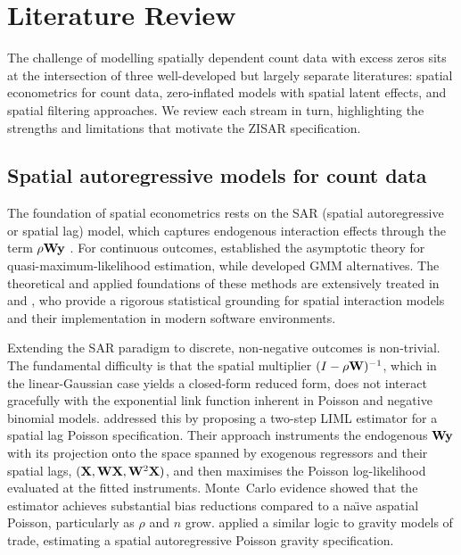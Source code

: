 \section{Literature Review}\label{sec:literature}

The challenge of modelling spatially dependent count data with excess zeros sits at the intersection of three well-developed but largely separate literatures: spatial econometrics for count data, zero-inflated models with spatial latent effects, and spatial filtering approaches.
We review each stream in turn, highlighting the strengths and limitations that motivate the ZISAR specification.

\subsection{Spatial autoregressive models for count data}\label{sec:lit_sar_count}

The foundation of spatial econometrics rests on the SAR (spatial autoregressive or spatial lag) model, which captures endogenous interaction effects through the term $\rho\mathbf{W}\mathbf{y}$ \citep{anselin1988,lesage_pace2009}.
For continuous outcomes, \citet{lee2004} established the asymptotic theory for quasi-maximum-likelihood estimation, while \citet{kelejian_prucha1998,kelejian_prucha1999} developed GMM alternatives.
The theoretical and applied foundations of these methods are extensively treated in \citet{arbia2006} and \citet{arbia2024}, who provide a rigorous statistical grounding for spatial interaction models and their implementation in modern software environments.

Extending the SAR paradigm to discrete, non-negative outcomes is non-trivial.
The fundamental difficulty is that the spatial multiplier $(I - \rho\mathbf{W})^{-1}$, which in the linear-Gaussian case yields a closed-form reduced form, does not interact gracefully with the exponential link function inherent in Poisson and negative binomial models.
\citet{lambert2010} addressed this by proposing a two-step LIML estimator for a spatial lag Poisson specification.
Their approach instruments the endogenous $\mathbf{W}\mathbf{y}$ with its projection onto the space spanned by exogenous regressors and their spatial lags, $(\mathbf{X}, \mathbf{W}\mathbf{X}, \mathbf{W}^2\mathbf{X})$, and then maximises the Poisson log-likelihood evaluated at the fitted instruments.
Monte~Carlo evidence showed that the estimator achieves substantial bias reductions compared to a na\"{\i}ve aspatial Poisson, particularly as $\rho$ and $n$ grow.
\citet{sellner2013} applied a similar logic to gravity models of trade, estimating a spatial autoregressive Poisson gravity specification.


